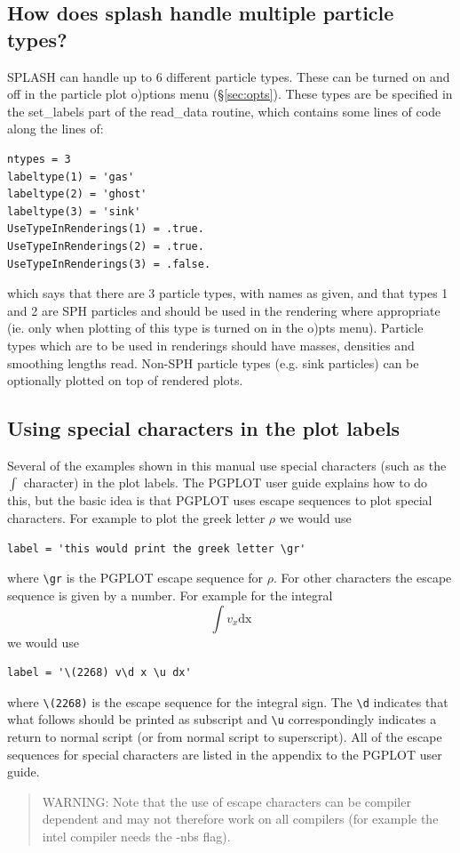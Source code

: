 \documentclass[a4paper,11pt]{article}
\begin{document}
\subsection{How does splash handle multiple particle types?}
SPLASH can handle up to 6 different particle types. These can be turned on and off in the particle plot
o)ptions menu (\S\ref{sec:opts}). These types are be specified in the set\_labels part of the read\_data
routine, which contains some lines of code along the lines of:
\begin{verbatim}
ntypes = 3
labeltype(1) = 'gas'
labeltype(2) = 'ghost'
labeltype(3) = 'sink'
UseTypeInRenderings(1) = .true.
UseTypeInRenderings(2) = .true.
UseTypeInRenderings(3) = .false.
\end{verbatim}
which says that there are 3 particle types, with names as given, and that types 1 and 2 are SPH particles and
should be used in the rendering where appropriate (ie. only when plotting of this type is turned on in the
o)pts menu). Particle types which are to be used in renderings should have masses, densities and smoothing
lengths read. Non-SPH particle types (e.g. sink particles) can be optionally plotted on top of rendered plots.

\subsection{Using special characters in the plot labels}
 Several of the examples shown in this manual use special characters (such as
the $\int$ character) in the plot labels. The PGPLOT user guide explains how to do
this, but the basic idea is that PGPLOT uses escape sequences to plot special
characters. For example to plot the greek letter $\rho$ we would use
\begin{verbatim}
label = 'this would print the greek letter \gr'
\end{verbatim}
where \verb+\gr+ is the PGPLOT escape sequence for $\rho$. For other
characters the escape sequence is given by a number. For example for the integral 
\begin{equation}
\int v_x \mathrm{dx}
\end{equation}
we would use
\begin{verbatim}
label = '\(2268) v\d x \u dx'
\end{verbatim}
where \verb+\(2268)+ is the escape sequence for the integral sign. The
\verb+\d+ indicates that what follows should be printed as subscript and
\verb+\u+ correspondingly indicates a return to normal script (or from normal script to
superscript). All of the escape sequences for special characters are listed in
the appendix to the PGPLOT user guide.
\begin{quote}
 WARNING: Note that the use of escape characters can be compiler dependent and
 may not therefore work on all compilers (for example the intel compiler needs
 the -nbs flag).
\end{quote}
\end{document}
